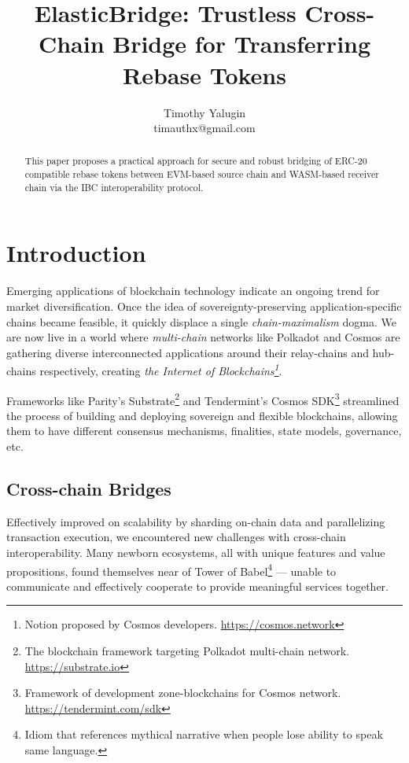 \documentclass{article}
\title{ElasticBridge: Trustless Cross-Chain Bridge for Transferring Rebase Tokens}
\author{Timothy Yalugin\\timauthx@gmail.com}
\begin{document}
\maketitle

\begin{abstract}

This paper proposes a practical approach for secure and robust bridging of ERC-20 compatible rebase tokens between EVM-based source chain and WASM-based receiver chain via the IBC interoperability protocol.

\end{abstract}

\section{Introduction}

Emerging applications of blockchain technology indicate an ongoing trend for market diversification. Once the idea of sovereignty-preserving application-specific chains became feasible, it quickly displace a single \textit{chain-maximalism} dogma. We are now live in a world where \textit{multi-chain} networks like Polkadot \cite{wood2016polkadot} and Cosmos \cite{kwon2016cosmos} are gathering diverse interconnected applications around their relay-chains and hub-chains respectively, creating \textit{the Internet of Blockchains\footnote{Notion proposed by Cosmos developers. \url{https://cosmos.network}}}.

Frameworks like Parity's Substrate\footnote{The blockchain framework
targeting Polkadot multi-chain network. \url{https://substrate.io}} and Tendermint's Cosmos SDK\footnote{Framework of development zone-blockchains for Cosmos network. \url{https://tendermint.com/sdk}} streamlined the process of building and deploying sovereign and flexible blockchains, allowing them to have different consensus mechanisms, finalities, state models, governance, etc.

\subsection{Cross-chain Bridges}

Effectively improved on scalability by sharding on-chain data and parallelizing transaction execution, we encountered new challenges with cross-chain interoperability. Many newborn ecosystems, all with unique features and value propositions, found themselves near of Tower of Babel\footnote{Idiom that references mythical narrative when people lose ability to speak same language. } --- unable to communicate and effectively cooperate to provide meaningful services together.
\end{document}
